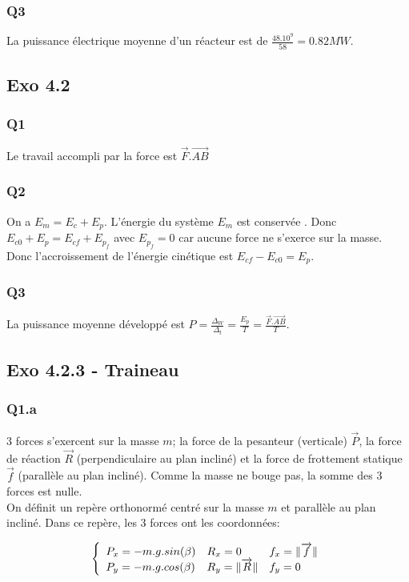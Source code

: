 \documentclass[]{book}
\theoremstyle{definition}
\begin{document}
\subsubsection{Q3}
La puissance \'electrique moyenne d'un r\'eacteur est de $\frac{48.10^{9}}{58} = 0.82 MW$.  

\subsection*{Exo 4.2}
\subsubsection{Q1}
Le travail accompli par la force est $\overrightarrow{F}.\overrightarrow{AB}$

\subsubsection{Q2}
On a $E_m = E_c + E_p$. L'\'energie du syst\`eme $E_m$ est conserv\'ee . Donc $E_{c0} + E_p = E_{cf} + E_{p_f}$ avec $E_{p_f} = 0$ car aucune force ne s'exerce sur la masse. Donc l'accroissement de l'\'energie cin\'etique est $E_{cf} - E_{c0} = E_p$.

\subsubsection{Q3}
La puissance moyenne d\'evelopp\'e est $P=\frac{\Delta_W}{\Delta_t} = \frac{E_p}{T} = \frac{\overrightarrow{F}.\overrightarrow{AB}}{T}$. 

\subsection*{Exo 4.2.3 - Traineau}
\subsubsection{Q1.a}
3 forces s'exercent sur la masse $m$; la force de la pesanteur (verticale) $\overrightarrow{P}$, la force de r\'eaction $\overrightarrow{R}$ (perpendiculaire au plan inclin\'e) et la force de frottement statique $\overrightarrow{f}$ (parall\`ele au plan inclin\'e). Comme la masse ne bouge pas, la somme des 3 forces est nulle.\\
On d\'efinit un rep\`ere orthonorm\'e centr\'e sur la masse $m$ et parall\`ele au plan inclin\'e. Dans ce rep\`ere, les 3 forces ont les coordonn\'ees:

$$
\left\{
\begin{array}{l l l}
 P_x = -m.g.sin(\beta) & R_x = 0 & f_x = \|\overrightarrow{f}\| \\
 P_y = -m.g.cos(\beta) & R_y = \|\overrightarrow{R}\| & f_y = 0\\
\end{array}
\right. 
$$
\end{document}
